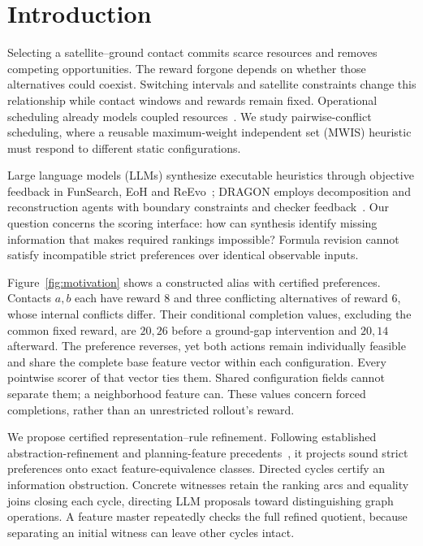 \section{Introduction}
\label{sec:introduction}

Selecting a satellite--ground contact commits scarce resources and removes
competing opportunities. The reward forgone depends on whether those
alternatives could coexist. Switching intervals and satellite constraints
change this relationship while contact windows and rewards remain fixed.
Operational scheduling already models coupled resources~\cite{augenstein2016optimal,
levinson2025optimal}. We study pairwise-conflict scheduling, where a reusable
maximum-weight independent set (MWIS) heuristic must respond to different
static configurations.

Large language models (LLMs) synthesize executable heuristics through
objective feedback in FunSearch, EoH and ReEvo~\cite{romeraparedes2024funsearch,
liu2024eoh,ye2024reevo}; DRAGON employs decomposition and reconstruction
agents with boundary constraints and checker feedback~\cite{chen2026dragon}.
Our question concerns the scoring interface: how can synthesis identify
missing information that makes required rankings impossible? Formula
revision cannot satisfy incompatible strict preferences over identical
observable inputs.

Figure~\ref{fig:motivation} shows a constructed alias with certified preferences. Contacts
$a,b$ each have reward $8$ and three conflicting alternatives of reward $6$,
whose internal conflicts differ. Their conditional completion values,
excluding the common fixed reward, are $20,26$ before a ground-gap
intervention and $20,14$ afterward. The preference reverses, yet both
actions remain individually feasible and share the complete base feature
vector within each configuration. Every pointwise scorer of that vector
ties them. Shared configuration fields cannot separate them; a neighborhood
feature can. These values concern forced completions, rather than an
unrestricted rollout's reward.

We propose certified representation--rule refinement. Following established
abstraction-refinement and planning-feature precedents~\cite{clarke2000cegar,
frances2021policies}, it projects sound strict preferences onto exact
feature-equivalence classes. Directed cycles certify an information
obstruction. Concrete witnesses retain the ranking arcs and equality joins
closing each cycle, directing LLM proposals toward distinguishing graph
operations. A feature master repeatedly checks the full refined quotient,
because separating an initial witness can leave other cycles intact.

